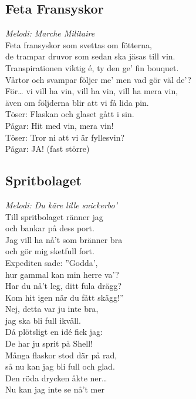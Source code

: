 \documentclass[a5paper]{article}
\begin{document}
\subsection{Feta Fransyskor}
\textit{Melodi: Marche Militaire} \\

\noindent
Feta fransyskor som svettas om fötterna, \\
de trampar druvor som sedan ska jäsas till vin. \\
Transpirationen viktig é, ty den ge’ fin bouquet. \\
Vårtor och svampar följer me’ men vad gör väl de’? \\

\noindent
För… vi vill ha vin, vill ha vin, vill ha mera vin, \\
även om följderna blir att vi få lida pin. \\
Töser: Flaskan och glaset gått i sin. \\
Pågar: Hit med vin, mera vin! \\
Töser: Tror ni att vi är fyllesvin? \\
Pågar: JA! (fast större) \\

\newpage
\subsection{Spritbolaget}

\textit{Melodi: Du käre lille snickerbo’} \\

\noindent
Till spritbolaget ränner jag \\
och bankar på dess port. \\
Jag vill ha nå’t som bränner bra \\
och gör mig sketfull fort. \\
Expediten sade: ”Godda’, \\
hur gammal kan min herre va’? \\
Har du nå’t leg, ditt fula drägg? \\
Kom hit igen när du fått skägg!” \\

\noindent
Nej, detta var ju inte bra, \\
jag ska bli full ikväll. \\
Då plötsligt en idé fick jag: \\
De har ju sprit på Shell! \\
Många flaskor stod där på rad, \\
så nu kan jag bli full och glad. \\
Den röda drycken åkte ner… \\
Nu kan jag inte se nå’t mer	\\
	
\end{document}
